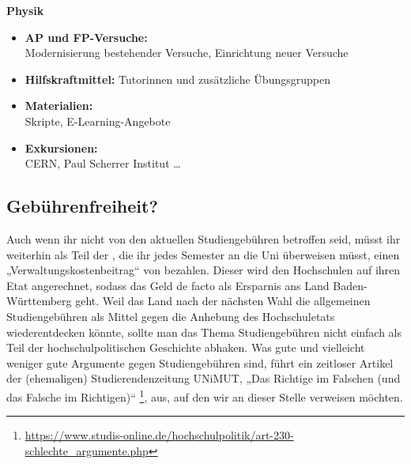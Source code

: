 \noindent\textbf{Physik}
\begin{itemize}
	\item \textbf{\gls{AP} und \gls{FP}-Versuche:}\\
	      Modernisierung bestehender Versuche, Einrichtung neuer Versuche
	\item \textbf{Hilfskraftmittel:}
	      Tutorinnen und zusätzliche Übungsgruppen
	\item \textbf{Materialien:}\\
	      Skripte, E-Learning-Angebote
	\item \textbf{Exkursionen:}\\
	      CERN, Paul Scherrer Institut \dots
\end{itemize}


\subsection{Gebührenfreiheit?}
Auch wenn ihr nicht von den aktuellen Studiengebühren betroffen seid, müsst ihr weiterhin als Teil der \EUR{\beitragssumme}, die ihr jedes Semester an die Uni überweisen müsst, einen „Verwaltungskostenbeitrag“ von \EUR{\verwaltungsbetrag} bezahlen. Dieser wird den Hochschulen auf ihren Etat angerechnet, sodass das Geld de facto als Ersparnis ans Land Baden-Württemberg geht. Weil das Land nach der nächsten Wahl die allgemeinen Studiengebühren als Mittel gegen die Anhebung des Hochschuletats wiederentdecken könnte, sollte man das Thema Studiengebühren nicht einfach als Teil der hochschulpolitischen Geschichte abhaken. Was gute und vielleicht weniger gute Argumente gegen Studiengebühren sind, führt ein zeitloser Artikel der (ehemaligen) Studierendenzeitung UNiMUT, „Das Richtige im Falschen (und das Falsche im Richtigen)“  \footnote{\url{https://www.studis-online.de/hochschulpolitik/art-230-schlechte_argumente.php}}, aus, auf den wir an dieser Stelle verweisen möchten.
